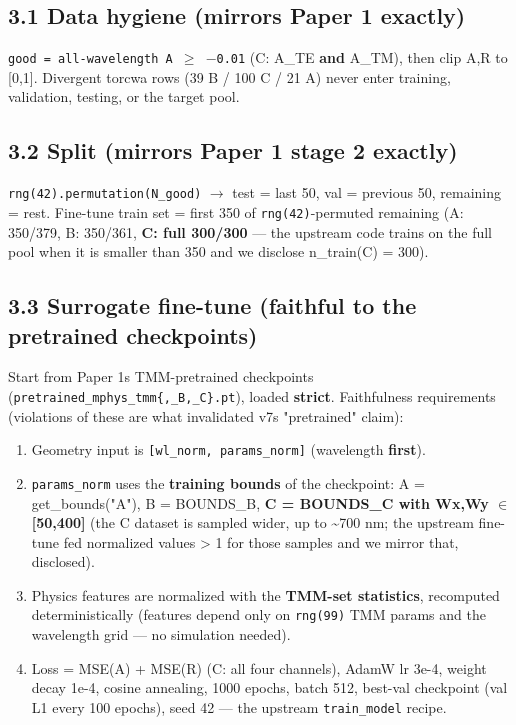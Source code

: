 \documentclass[11pt,a4paper]{article}
\providecommand{\tightlist}{\setlength{\itemsep}{0pt}\setlength{\parskip}{0pt}}
\begin{document}
\subsection*{3.1 Data hygiene (mirrors Paper 1 exactly)}

\texttt{good\ =\ all-wavelength\ A\ \ensuremath{\geq}\ \ensuremath{-}0.01} (C: A\_TE \textbf{and} A\_TM), then clip A,R to
{[}0,1{]}. Divergent torcwa rows (39 B / 100 C / 21 A) never enter training,
validation, testing, or the target pool.

\subsection*{3.2 Split (mirrors Paper 1 stage 2 exactly)}

\texttt{rng(42).\allowbreak{}permutation(N\_\allowbreak{}good)} \ensuremath{\rightarrow} test = last 50, val = previous 50,
remaining = rest. Fine-tune train set = first 350 of \texttt{rng(42)}-permuted
remaining (A: 350/379, B: 350/361, \textbf{C: full 300/300} --- the upstream code
trains on the full pool when it is smaller than 350 and we disclose
n\_train(C) = 300).

\subsection*{3.3 Surrogate fine-tune (faithful to the pretrained checkpoints)}

Start from Paper 1\textquotesingle s TMM-pretrained checkpoints
(\texttt{pretrained\_\allowbreak{}mphys\_\allowbreak{}tmm\{,\allowbreak{}\_\allowbreak{}B,\allowbreak{}\_\allowbreak{}C\}.\allowbreak{}pt}), loaded \textbf{strict}. Faithfulness
requirements (violations of these are what invalidated v7\textquotesingle s "pretrained"
claim):

\begin{enumerate}
\def\labelenumi{\arabic{enumi}.}
\tightlist
\item
  Geometry input is \texttt{{[}wl\_norm,\ params\_norm{]}} (wavelength \textbf{first}).
\item
  \texttt{params\_norm} uses the \textbf{training bounds} of the checkpoint:
  A = get\_bounds("A"), B = BOUNDS\_B, \textbf{C = BOUNDS\_C with Wx,Wy \ensuremath{\in} {[}50,400{]}}
  (the C dataset is sampled wider, up to \textasciitilde700 nm; the upstream fine-tune fed
  normalized values \textgreater{} 1 for those samples and we mirror that, disclosed).
\item
  Physics features are normalized with the \textbf{TMM-set statistics}, recomputed
  deterministically (features depend only on \texttt{rng(99)} TMM params and the
  wavelength grid --- no simulation needed).
\item
  Loss = MSE(A) + MSE(R) (C: all four channels), AdamW lr 3e-4, weight decay
  1e-4, cosine annealing, 1000 epochs, batch 512, best-val checkpoint
  (val L1 every 100 epochs), seed 42 --- the upstream \texttt{train\_model} recipe.
\end{enumerate}
\end{document}
